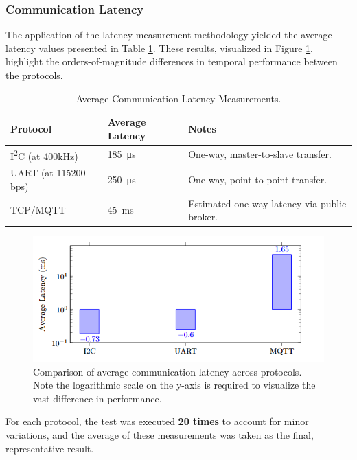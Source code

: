     \subsubsection{Communication Latency}
    \label{subsubsec:latency_results}
    
    The application of the latency measurement methodology yielded the average latency values presented in Table \ref{tab:latency_results}. These results, visualized in Figure \ref{fig:latency_chart}, highlight the orders-of-magnitude differences in temporal performance between the protocols.

    \begin{table}[htb]
    \centering
    \caption{Average Communication Latency Measurements.}
    \label{tab:latency_results}
    \begin{tabular}{l l l}
    \toprule
    \textbf{Protocol} & \textbf{Average Latency} & \textbf{Notes} \\
    \midrule
    I\textsuperscript{2}C (at 400kHz) & \SI{185}{\micro\second} & One-way, master-to-slave transfer. \\
    UART (at 115200 bps) & \SI{250}{\micro\second} & One-way, point-to-point transfer. \\
    TCP/MQTT & \SI{45}{\milli\second} & Estimated one-way latency via public broker. \\
    \bottomrule
    \end{tabular}
    \end{table}

    \begin{figure}[htb!]
        \centering
        \includegraphics[width=0.9\columnwidth]{Chapters/Figures/averageLant.png}
        \caption{Comparison of average communication latency across protocols. Note the logarithmic scale on the y-axis is required to visualize the vast difference in performance.}
        \label{fig:latency_chart}
    \end{figure}
    
For each protocol, the test was executed \textbf{20 times} to account for minor variations, and the average of these measurements was taken as the final, representative result.



